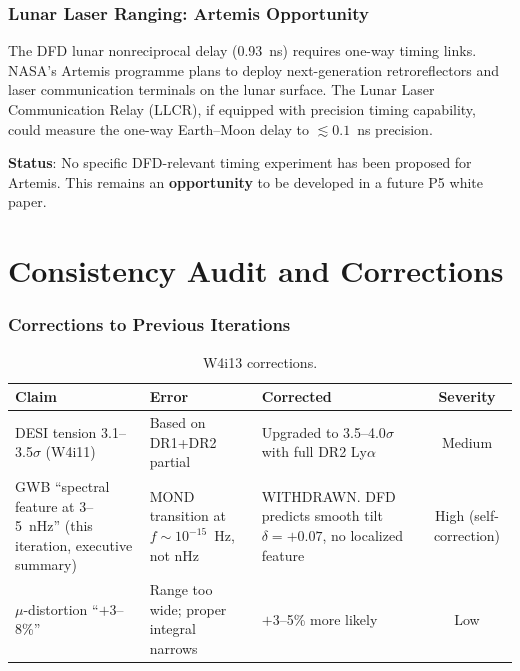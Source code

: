 \documentclass[11pt,a4paper]{article}
\begin{document}
\section{Lunar Laser Ranging: Artemis Opportunity}

The DFD lunar nonreciprocal delay (0.93~ns) requires one-way timing
links. NASA's Artemis programme plans to deploy next-generation
retroreflectors and laser communication terminals on the lunar surface.
The Lunar Laser Communication Relay (LLCR), if equipped with
precision timing capability, could measure the one-way Earth--Moon
delay to $\lesssim 0.1$~ns precision.

\textbf{Status}: No specific DFD-relevant timing experiment has been
proposed for Artemis. This remains an \textbf{opportunity} to be
developed in a future P5 white paper.


\part{Consistency Audit and Corrections}
\label{sec:audit}

\section{Corrections to Previous Iterations}

\begin{table}[H]
\centering
\caption{W4i13 corrections.}
\begin{tabular}{p{4cm}p{4cm}p{5cm}c}
\toprule
\textbf{Claim} & \textbf{Error} & \textbf{Corrected} & \textbf{Severity} \\
\midrule
DESI tension 3.1--3.5$\sigma$ (W4i11) & Based on DR1+DR2 partial & Upgraded to 3.5--4.0$\sigma$ with full DR2 Ly$\alpha$ & Medium \\
\midrule
GWB ``spectral feature at 3--5~nHz'' (this iteration, executive summary) & MOND transition at $f \sim 10^{-15}$~Hz, not nHz & WITHDRAWN. DFD predicts smooth tilt $\delta = +0.07$, no localized feature & High (self-correction) \\
\midrule
$\mu$-distortion ``$+3$--8\%'' & Range too wide; proper integral narrows & $+3$--5\% more likely & Low \\
\bottomrule
\end{tabular}
\end{table}
\end{document}
